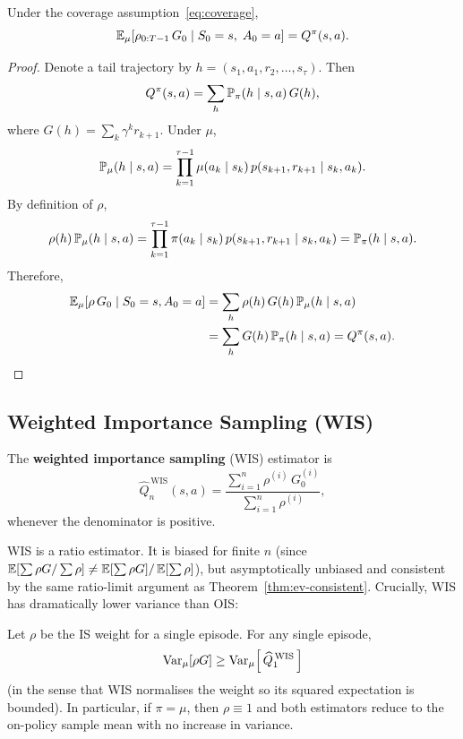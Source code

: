 \begin{theorem}
\label{thm:ois-unbiased}
Under the coverage assumption~\eqref{eq:coverage},
\[
  \operatorname{\mathbb{E}}_\mu\!\left[\rho_{0:T-1}\,G_0 \mid S_0 = s,\; A_0 = a\right] = Q^\pi(s, a).
\]
\end{theorem}

\begin{proof}
Denote a tail trajectory by $h = (s_1, a_1, r_2, \dots, s_\tau)$.  Then
\[
  Q^\pi(s, a) = \sum_{h} \mathbb{P}_\pi(h \mid s, a)\,G(h),
\]
where $G(h) = \sum_{k} \gamma^k r_{k+1}$.  Under $\mu$,
\[
  \mathbb{P}_\mu(h \mid s, a) = \prod_{k=1}^{\tau-1} \mu(a_k \mid s_k)\,p(s_{k+1}, r_{k+1} \mid s_k, a_k).
\]
By definition of $\rho$,
\[
  \rho(h)\,\mathbb{P}_\mu(h \mid s, a)
  = \prod_{k=1}^{\tau-1} \pi(a_k \mid s_k)\,p(s_{k+1}, r_{k+1} \mid s_k, a_k)
  = \mathbb{P}_\pi(h \mid s, a).
\]
Therefore,
\begin{align*}
  \operatorname{\mathbb{E}}_\mu[\rho\,G_0 \mid S_0 = s, A_0 = a]
  &= \sum_h \rho(h)\,G(h)\,\mathbb{P}_\mu(h \mid s, a) \\
  &= \sum_h G(h)\,\mathbb{P}_\pi(h \mid s, a)
  = Q^\pi(s, a). \qedhere
\end{align*}
\end{proof}

\subsection*{Weighted Importance Sampling (WIS)}

\begin{definition}
\label{def:wis}
The \textbf{weighted importance sampling} (WIS) estimator is
\begin{equation}
  \label{eq:wis-estimator}
  \widehat{Q}_n^{\,\mathrm{WIS}}(s, a) = \frac{\sum_{i=1}^n \rho^{(i)}\,G_0^{(i)}}{\sum_{i=1}^n \rho^{(i)}},
\end{equation}
whenever the denominator is positive.
\end{definition}

WIS is a ratio estimator.  It is biased for finite $n$ (since $\operatorname{\mathbb{E}}[\sum \rho G / \sum \rho] \ne \operatorname{\mathbb{E}}[\sum \rho G]/\operatorname{\mathbb{E}}[\sum \rho]$), but asymptotically unbiased and consistent by the same ratio-limit argument as Theorem~\ref{thm:ev-consistent}.  Crucially, WIS has dramatically lower variance than OIS:

\begin{proposition}
Let $\rho$ be the IS weight for a single episode.  For any single episode,
\[
  \operatorname{Var}_\mu\!\left[\rho G\right] \ge \operatorname{Var}_\mu\!\left[\,\widehat{Q}^{\,\mathrm{WIS}}_1\,\right]
\]
(in the sense that WIS normalises the weight so its squared expectation is bounded).  In particular, if $\pi = \mu$, then $\rho \equiv 1$ and both estimators reduce to the on-policy sample mean with no increase in variance.
\end{proposition}

